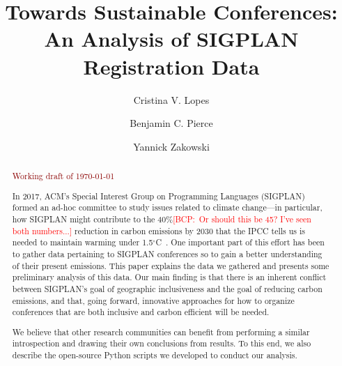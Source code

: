 \documentclass[screen,acmlarge]{acmart}
\newcommand{\bcp}[1]{\textcolor{red}{{[BCP:~#1]}}}
\newcommand{\bcp}[1]{}
\newif\ifopinions\opinionsfalse   %
\begin{document}
\title{Towards Sustainable Conferences: An Analysis of SIGPLAN Registration
  Data} 

\author{Cristina V. Lopes}

\author{Benjamin C. Pierce}

\author{Yannick Zakowski}

\begin{abstract}

\bigskip
\begin{center}
{\huge\textcolor{darkred}{Working draft of \today}}
\end{center}
\bigskip
\bigskip

In 2017, ACM's Special Interest Group on Programming Languages (SIGPLAN)
formed an ad-hoc committee to study issues related to climate change---in
particular, how SIGPLAN might contribute to the 40\%\bcp{Or should this be
  45? I've seen both numbers...} reduction in carbon
emissions by 2030 that the IPCC tells us is needed to maintain warming under
1.5$^{\circ}$C~\cite{IPCCReport}.
One important part of this effort has been
to gather data pertaining to SIGPLAN conferences so to gain a better
understanding of their present emissions. This paper explains the data we
gathered and presents some preliminary analysis of this data. Our main
finding is that there is an inherent conflict between SIGPLAN's goal of
geographic inclusiveness and the goal of reducing carbon emissions, and
that, going forward, innovative approaches for how to organize conferences
that are both inclusive and carbon efficient will be needed.

We believe that other research communities can benefit from performing a
similar introspection and drawing their own conclusions from results. To
this end, we also describe the open-source Python scripts we developed to
conduct our analysis.

\end{abstract}


\maketitle






\ifopinions\fi




\end{document}
